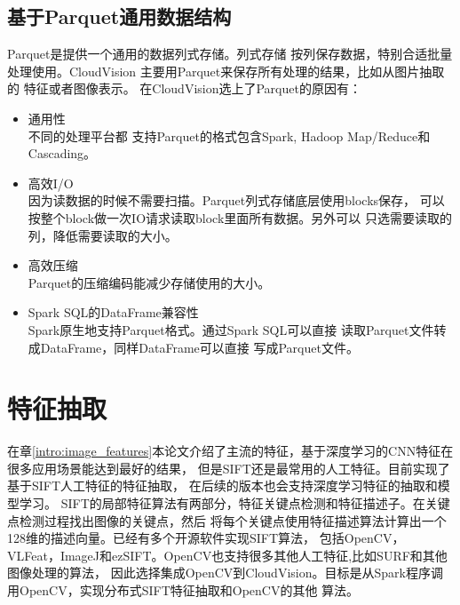 \subsection{基于Parquet通用数据结构}
\label{subsec:parquet}
Parquet是提供一个通用的数据列式存储。列式存储
按列保存数据，特别合适批量处理使用。CloudVision
主要用Parquet来保存所有处理的结果，比如从图片抽取的
特征或者图像表示。
在CloudVision选上了Parquet的原因有：
\begin{itemize}
  \item 通用性 \\
        不同的处理平台都
        支持Parquet的格式包含Spark, Hadoop Map/Reduce和Cascading。
  \item 高效I/O \\
        因为读数据的时候不需要扫描。Parquet列式存储底层使用blocks保存，
        可以按整个block做一次IO请求读取block里面所有数据。另外可以
        只选需要读取的列，降低需要读取的大小。
  \item 高效压缩 \\
        Parquet的压缩编码能减少存储使用的大小。
  \item Spark SQL的DataFrame兼容性 \\
        Spark原生地支持Parquet格式。通过Spark SQL可以直接
        读取Parquet文件转成DataFrame，同样DataFrame可以直接
        写成Parquet文件。
\end{itemize}



\section{特征抽取}
\label{sec:feature-extraction}
在章\ref{intro:image_features}本论文介绍了主流的特征，基于深度学习的CNN特征在很多应用场景能达到最好的结果，
但是SIFT还是最常用的人工特征。目前实现了基于SIFT人工特征的特征抽取，
在后续的版本也会支持深度学习特征的抽取和模型学习。
SIFT的局部特征算法有两部分，特征关键点检测和特征描述子。在关键点检测过程找出图像的关键点，然后
将每个关键点使用特征描述算法计算出一个128维的描述向量。已经有多个开源软件实现SIFT算法，
包括OpenCV，VLFeat，ImageJ和ezSIFT。OpenCV也支持很多其他人工特征,比如SURF和其他图像处理的算法，
因此选择集成OpenCV到CloudVision。目标是从Spark程序调用OpenCV，实现分布式SIFT特征抽取和OpenCV的其他
算法。

